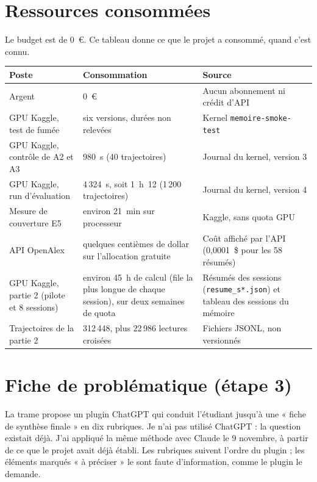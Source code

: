 \documentclass[10pt,a4paper]{article}
\newcommand{\f}[1]{\texttt{\small #1}}
\begin{document}
\section{Ressources consommées}

Le budget est de 0~€. Ce tableau donne ce que le projet a consommé, quand c'est connu.

\small
\begin{longtable}{@{}P{5.2cm}P{4.4cm}P{6cm}@{}}
\toprule
Poste & Consommation & Source\\
\midrule\endhead
Argent & 0~€ & Aucun abonnement ni crédit d'API\\
GPU Kaggle, test de fumée & six versions, durées non relevées & Kernel \f{memoire-smoke-test}\\
GPU Kaggle, contrôle de A2 et A3 & 980~s (40 trajectoires) & Journal du kernel, version 3\\
GPU Kaggle, run d'évaluation & 4\,324~s, soit 1~h~12 (1\,200 trajectoires) & Journal du kernel, version 4\\
Mesure de couverture E5 & environ 21~min sur processeur & Kaggle, sans quota GPU\\
API OpenAlex & quelques centièmes de dollar sur l'allocation gratuite & Coût affiché par l'API (0,0001~\$ pour les 58 résumés)\\
GPU Kaggle, partie 2 (pilote et 8 sessions) & environ 45~h de calcul (file la plus longue de chaque session), sur deux semaines de quota & Résumés des sessions (\f{resume\_s*.json}) et tableau des sessions du mémoire\\
Trajectoires de la partie 2 & 312\,448, plus 22\,986 lectures croisées & Fichiers JSONL, non versionnés\\
\bottomrule
\end{longtable}
\normalsize

\section{Fiche de problématique (étape 3)}\label{sec:fiche}

La trame propose un plugin ChatGPT qui conduit l'étudiant jusqu'à une « fiche de synthèse finale » en dix rubriques. Je n'ai pas utilisé ChatGPT : la question existait déjà. J'ai appliqué la même méthode avec Claude le 9 novembre, à partir de ce que le projet avait déjà établi. Les rubriques suivent l'ordre du plugin ; les éléments marqués « à préciser » le sont faute d'information, comme le plugin le demande.
\end{document}
